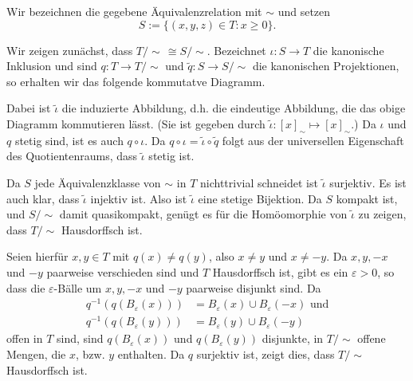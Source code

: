 \documentclass[a4paper,10pt]{article}
\begin{document}
Wir bezeichnen die gegebene Äquivalenzrelation mit $\sim$ und setzen
\[
 S := \{(x,y,z) \in T : x \geq 0\}.
\]

Wir zeigen zunächst, dass $T/\!\sim\, \cong S/\!\sim$. Bezeichnet $\iota : S \to T$ die kanonische Inklusion und sind $q : T \to T/\sim$ und $\tilde{q} : S \to S/\sim$ die kanonischen Projektionen, so erhalten wir das folgende kommutatve Diagramm.
 \begin{center}
 \end{center}
Dabei ist $\tilde{\iota}$ die induzierte Abbildung, d.h. die eindeutige Abbildung, die das obige Diagramm kommutieren lässt. (Sie ist gegeben durch $\tilde{\iota} : [x]_\sim \mapsto [x]_\sim$.) Da $\iota$ und $q$ stetig sind, ist es auch $q \circ \iota$. Da $q \circ \iota = \tilde{\iota} \circ \tilde{q}$ folgt aus der universellen Eigenschaft des Quotientenraums, dass $\tilde{\iota}$ stetig ist.

Da $S$ jede Äquivalenzklasse von $\sim$ in $T$ nichttrivial schneidet ist $\tilde{\iota}$ surjektiv. Es ist auch klar, dass $\tilde{\iota}$ injektiv ist. Also ist $\tilde{\iota}$ eine stetige Bijektion. Da $S$ kompakt ist, und $S/\sim$ damit quasikompakt, genügt es für die Homöomorphie von $\tilde{\iota}$ zu zeigen, dass $T/\sim$ Hausdorffsch ist.

Seien hierfür $x,y \in T$ mit $q(x) \neq q(y)$, also $x \neq y$ und $x \neq -y$. Da $x, y, -x$ und $-y$ paarweise verschieden sind und $T$ Hausdorffsch ist, gibt es ein $\varepsilon > 0$, so dass die $\varepsilon$-Bälle um $x, y, -x$ und $-y$ paarweise disjunkt sind. Da
\begin{align*}
 q^{-1}(q(B_\varepsilon(x))) &= B_\varepsilon(x) \cup B_\varepsilon(-x) \text{ und} \\
 q^{-1}(q(B_\varepsilon(y))) &= B_\varepsilon(y) \cup B_\varepsilon(-y) 
\end{align*}
offen in $T$ sind, sind $q(B_\varepsilon(x))$ und $q(B_\varepsilon(y))$ disjunkte, in $T/\sim$ offene Mengen, die $x$, bzw. $y$ enthalten. Da $q$ surjektiv ist, zeigt dies, dass $T/\sim$ Hausdorffsch ist.
\end{document}
